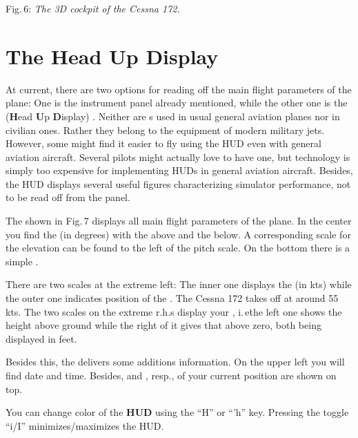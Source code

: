 \smallskip
 \noindent
Fig.\,6: \textit{The 3D cockpit of the Cessna 172.}
\medskip


\section{The Head Up Display}

At current, there are two options for reading off the main flight parameters of the
plane: One is the instrument panel already mentioned, while the other one is the
 (\textbf{H}ead \textbf{U}p \textbf{D}isplay) . Neither
are s used in usual general aviation planes nor in civilian ones. Rather they
belong to the equipment of modern military jets. However, some might find it easier to
fly using the HUD even with general aviation aircraft. Several  pilots
might actually love to have one, but technology is simply too expensive for implementing
HUDs in general aviation aircraft. Besides, the HUD displays several useful figures
characterizing simulator performance, not to be read off from the panel.

The  shown in Fig.\,7  displays all main flight parameters of the plane. In
the center you find the  (in degrees) with the  above and the  below. A corresponding scale for the
elevation can be found to the left of the pitch scale. On the
bottom there is a simple .

There are two scales at the extreme left: The inner one displays the  (in
kts) while the outer one indicates position of the . The Cessna 172 takes
off at around 55 kts. The two scales on the extreme r.h.s display your ,
i.\,e\. the left one shows the height above ground while the right of it gives that above
zero, both being displayed in feet.

Besides this, the  delivers some additions information. On the upper left you
will find date and time. Besides,   and , resp., of your current position are shown on top.

You can change color of the \textbf{HUD} using the ``H'' or ``'h''  key.
Pressing the toggle ``i/I'' minimizes/maximizes the HUD.

